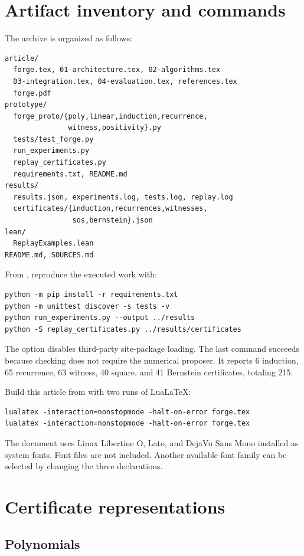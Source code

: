 \appendix
\section{Artifact inventory and commands}

The archive is organized as follows:
\begin{lstlisting}
article/
  forge.tex, 01-architecture.tex, 02-algorithms.tex
  03-integration.tex, 04-evaluation.tex, references.tex
  forge.pdf
prototype/
  forge_proto/{poly,linear,induction,recurrence,
               witness,positivity}.py
  tests/test_forge.py
  run_experiments.py
  replay_certificates.py
  requirements.txt, README.md
results/
  results.json, experiments.log, tests.log, replay.log
  certificates/{induction,recurrences,witnesses,
                sos,bernstein}.json
lean/
  ReplayExamples.lean
README.md, SOURCES.md
\end{lstlisting}

From , reproduce the executed work with:
\begin{lstlisting}
python -m pip install -r requirements.txt
python -m unittest discover -s tests -v
python run_experiments.py --output ../results
python -S replay_certificates.py ../results/certificates
\end{lstlisting}
The  option disables third-party site-package loading. The last
command succeeds because checking does not require the numerical proposer.
It reports 6 induction, 65 recurrence, 63 witness, 40 square, and 41 Bernstein
certificates, totaling 215.

Build this article from  with two runs of LuaLaTeX:
\begin{lstlisting}
lualatex -interaction=nonstopmode -halt-on-error forge.tex
lualatex -interaction=nonstopmode -halt-on-error forge.tex
\end{lstlisting}
The document uses Linux Libertine O, Lato, and DejaVu Sans Mono installed as
system fonts. Font files are not included. Another available font family can
be selected by changing the three  declarations.

\section{Certificate representations}

\subsection{Polynomials}

